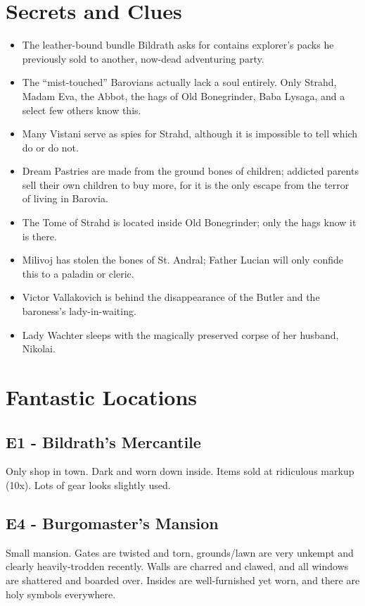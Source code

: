 \documentclass[a4paper,11pt]{article}
\begin{document}
\section{Secrets and Clues}
\label{sec:SecretsAndClues}
\begin{itemize}
  \item The leather-bound bundle Bildrath asks for contains explorer's packs he previously sold to another,
  now-dead adventuring party.
  \item The ``mist-touched'' Barovians actually lack a soul entirely. Only Strahd, Madam Eva, the Abbot, the hags
  of Old Bonegrinder, Baba Lysaga, and a select few others know this.
  \item Many Vistani serve as spies for Strahd, although it is impossible to tell which do or do not.
  \item Dream Pastries are made from the ground bones of children; addicted parents sell their own children to 
  buy more, for it is the only escape from the terror of living in Barovia.
  \item The Tome of Strahd is located inside Old Bonegrinder; only the hags know it is there.
  \item Milivoj has stolen the bones of St. Andral; Father Lucian will only confide this to a paladin or cleric.
  \item Victor Vallakovich is behind the disappearance of the Butler and the baroness's lady-in-waiting.
  \item Lady Wachter sleeps with the magically preserved corpse of her husband, Nikolai.
\end{itemize}

\section{Fantastic Locations}
\label{sec:FantasticLocations}
\subsection{E1 - Bildrath's Mercantile}
  Only shop in town. Dark and worn down inside. Items sold at ridiculous markup (10x). Lots of gear looks 
  slightly used.
\subsection{E4 - Burgomaster's Mansion}
  Small mansion. Gates are twisted and torn, grounds/lawn are very unkempt and clearly heavily-trodden recently.
  Walls are charred and clawed, and all windows are shattered and boarded over. Insides are well-furnished yet
  worn, and there are holy symbols everywhere.
\end{document}

